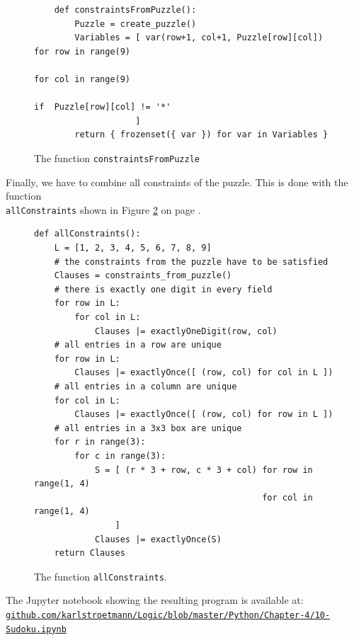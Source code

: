 \begin{figure}[!ht]
\centering
\begin{verbatim}
    def constraintsFromPuzzle():
        Puzzle = create_puzzle()
        Variables = [ var(row+1, col+1, Puzzle[row][col]) for row in range(9)
                                                          for col in range(9)
                                                          if  Puzzle[row][col] != '*'
                    ]
        return { frozenset({ var }) for var in Variables }                 
\end{verbatim}
\vspace*{-0.3cm}
\caption{The function \texttt{constraintsFromPuzzle}}
\label{fig:sudoku-constraintsFromPuzzle}
\end{figure}

Finally, we have to combine all constraints of the puzzle.  This is done with the function \\
\texttt{allConstraints} shown in Figure \ref{fig:sudoku-allConstraints} on page \pageref{fig:sudoku-allConstraints}.

\begin{figure}[!ht]
\centering
\begin{verbatim}
def allConstraints(): 
    L = [1, 2, 3, 4, 5, 6, 7, 8, 9]
    # the constraints from the puzzle have to be satisfied
    Clauses = constraints_from_puzzle()
    # there is exactly one digit in every field
    for row in L:
        for col in L:
            Clauses |= exactlyOneDigit(row, col) 
    # all entries in a row are unique
    for row in L:
        Clauses |= exactlyOnce([ (row, col) for col in L ]) 
    # all entries in a column are unique
    for col in L:
        Clauses |= exactlyOnce([ (row, col) for row in L ])
    # all entries in a 3x3 box are unique    
    for r in range(3):
        for c in range(3):
            S = [ (r * 3 + row, c * 3 + col) for row in range(1, 4)
                                             for col in range(1, 4) 
                ]
            Clauses |= exactlyOnce(S)
    return Clauses
 \end{verbatim}
\vspace*{-0.3cm}
\caption{The function \texttt{allConstraints}.}
\label{fig:sudoku-allConstraints}
\end{figure}
The Jupyter notebook showing the resulting program is available at:
\\[0.2cm]
\hspace*{1.3cm}
\href{https://github.com/karlstroetmann/Logic/blob/master/Python/Chapter-4/10-Sudoku.ipynb}{\texttt{github.com/karlstroetmann/Logic/blob/master/Python/Chapter-4/10-Sudoku.ipynb}}


